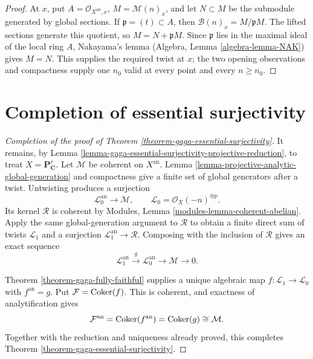 \begin{proof}
At $x$, put $A=\mathcal O_{X^{\mathrm{an}},x}$,
$M=\mathcal M(n)_x$, and let $N\subset M$ be the submodule generated by
global sections. If $\mathfrak p=(t)\subset A$, then
$\mathcal B(n)_x=M/\mathfrak pM$. The lifted sections generate this
quotient, so $M=N+\mathfrak pM$. Since $\mathfrak p$ lies in the maximal
ideal of the local ring $A$, Nakayama's lemma (Algebra, Lemma
\ref{algebra-lemma-NAK}) gives $M=N$. This supplies the required twist at
$x$; the two opening observations and compactness supply one $n_0$ valid at
every point and every $n\geq n_0$.
\end{proof}

\section{Completion of essential surjectivity}
\label{section-completion-gaga-essential-surjectivity}

\begin{proof}[Completion of the proof of Theorem
\ref{theorem-gaga-essential-surjectivity}]
It remains, by Lemma
\ref{lemma-gaga-essential-surjectivity-projective-reduction}, to treat
$X=\mathbf P^r_{\mathbf C}$. Let $\mathcal M$ be coherent on
$X^{\mathrm{an}}$. Lemma
\ref{lemma-projective-analytic-global-generation} and compactness give a
finite set of global generators after a twist. Untwisting produces a
surjection
$$
\mathcal L_0^{\mathrm{an}}\longrightarrow\mathcal M,
\qquad
\mathcal L_0=\mathcal O_X(-n)^{\oplus p}.
$$
Its kernel $\mathcal R$ is coherent by Modules, Lemma
\ref{modules-lemma-coherent-abelian}. Apply the same global-generation
argument to $\mathcal R$ to obtain a finite direct sum of twists
$\mathcal L_1$ and a surjection
$\mathcal L_1^{\mathrm{an}}\to\mathcal R$. Composing with the inclusion of
$\mathcal R$ gives an exact sequence
$$
\mathcal L_1^{\mathrm{an}}\xrightarrow{g}
\mathcal L_0^{\mathrm{an}}\longrightarrow\mathcal M\longrightarrow0.
$$

Theorem \ref{theorem-gaga-fully-faithful} supplies a unique algebraic map
$f:\mathcal L_1\to\mathcal L_0$ with $f^{\mathrm{an}}=g$. Put
$\mathcal F=\mathop{\rm Coker}(f)$. This is coherent, and exactness of
analytification gives
$$
\mathcal F^{\mathrm{an}}
=\mathop{\rm Coker}(f^{\mathrm{an}})
=\mathop{\rm Coker}(g)
\cong\mathcal M.
$$
Together with the reduction and uniqueness already proved, this completes
Theorem \ref{theorem-gaga-essential-surjectivity}.
\end{proof}
